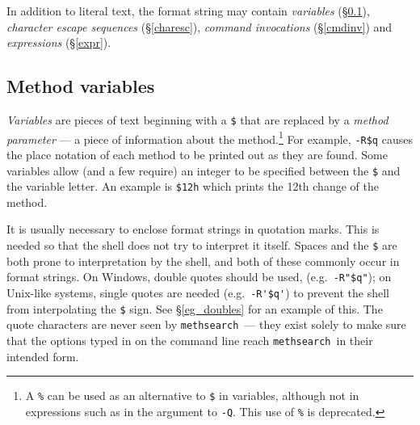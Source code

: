 \documentclass[a4paper,11pt,oneside]{book}
\makeatletter
\newcommand{\symidx}[2]{} %
\def\methsearch{\texttt{meth\-search}}
\newcommand{\sref}[1]{\hyperref[#1]{\S\ref{#1}}}
\makeatother
\begin{document}
In addition to literal text, the format string may contain
\textit{variables} (\sref{variables}), 
\textit{character escape sequences} (\sref{charesc}),
\textit{command invocations} (\sref{cmdinv}) and
\textit{expressions} (\sref{expr}).  

\subsection{Method variables}\label{variables}

\textit{Variables} are pieces of text beginning with a 
\verb+$+\symidx{\$}{variables}
that are replaced by a \textit{method parameter} --- a piece of information
about the method.\footnote{A \verb+%+\symidx{\%}{variable} 
can be used as an alternative to
\verb+$+ in variables, although not in expressions such as in
the argument to \verb+-Q+.  This use of \verb+%+ is deprecated.}
For example, \verb+-R$q+ causes the place notation%
 of each method to be printed out as they are found.
Some variables allow (and a few require) an integer to be specified
between the \verb+$+ and the variable letter.  
An example is \verb+$12h+ which prints the 12th change of the method.

It is usually necessary to enclose format strings in quotation marks.%
  This is needed so that the shell does not try to
interpret it itself.  Spaces and the \verb+$+ 
are both prone to interpretation by the shell, and both of these commonly
occur in format strings.  On Windows, double quotes should be used,
(e.g.\ \verb+-R"$q"+); on Unix-like systems, single quotes are needed 
(e.g.\ \verb+-R'$q'+) to prevent the shell from 
interpolating the \verb+$+ sign.  See
\sref{eg_doubles} for an example of this.  The quote characters are never
seen by \methsearch\ --- they exist solely to make sure that the options
typed in on the command line reach \methsearch\ in their intended form.
\end{document}
